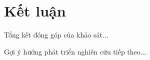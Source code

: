 \chapter*{Kết luận}

Tổng kết đóng góp của khảo sát...

Gợi ý hướng phát triển nghiên cứu tiếp theo...
